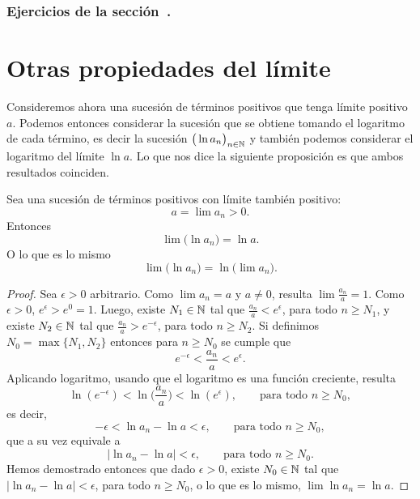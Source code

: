 \subsubsection*{Ejercicios de la sección~.}

\begin{enumerate}

\end{enumerate}


\section{Otras propiedades del límite}

Consideremos ahora una sucesión \sucan de términos positivos que tenga límite positivo $a$.
Podemos entonces considerar la sucesión que se obtiene tomando el logaritmo de cada término, es decir la sucesión $\big( \ln a_n \big)_{n\in\mathbb{N}}$ y también podemos considerar el logaritmo del límite $\ln a$. Lo que nos dice la siguiente proposición es que ambos resultados coinciden.

\begin{proposition}\label{P:logaritmo continuo}
    Sea \sucan una sucesión de términos positivos con límite también positivo:
    \[ 
    a = \lim a_n > 0.
    \]
    Entonces
    \[
    \lim \big(\ln a_n \big) = \ln a.
    \]
    O lo que es lo mismo
    \[
    \lim \big(\ln a_n \big) = \ln \big( \lim a_n \big).
    \]
\end{proposition}

\begin{proof}
    Sea $\epsilon>0$ arbitrario. Como $\lim a_n = a$ y $a\neq 0$, resulta $\lim \frac{a_n}a = 1$.
    Como $\epsilon>0$, $e^\epsilon > e^0=1$.
    Luego, existe $N_1\in\mathbb{N}$ tal que $\frac{a_n}{a} < e^\epsilon$, para todo $n\ge N_1$, y existe $N_2\in\mathbb{N}$ tal que $\frac{a_n}{a} > e^{-\epsilon}$, para todo $n\ge N_2$.
    Si definimos $N_0 = \max\{N_1,N_2\}$ entonces para $n\ge N_0$ se cumple que
    \[
    e^{-\epsilon} < \frac{a_n}a < e^\epsilon.
    \]
    Aplicando logaritmo, usando que el logaritmo es una función creciente, resulta
    \[
    \ln(e^{-\epsilon}) < \ln\big(\frac{a_n}a\big) < \ln(e^\epsilon),
    \qquad\text{para todo $n \ge N_0$},
    \]
    es decir,
    \[
    -\epsilon < \ln a_n - \ln a < \epsilon, \qquad\text{para todo $n \ge N_0$},
    \]
    que a su vez equivale a 
    \[
    |\ln a_n - \ln a| < \epsilon, \qquad\text{para todo $n \ge N_0$}.
    \]
    Hemos demostrado entonces que dado $\epsilon > 0$, existe $N_0\in\mathbb{N}$ tal que
    $|\ln a_n - \ln a| < \epsilon$, para todo $n \ge N_0$, o lo que es lo mismo, $\lim \ln a_n = \ln a$.
\end{proof}

